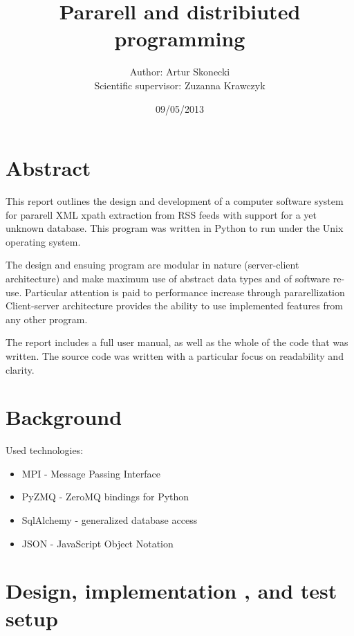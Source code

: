 \documentclass[a4paper,12pt]{article}
\title{Pararell and distribiuted programming}
\author{Author: Artur Skonecki \\ Scientific supervisor: Zuzanna Krawczyk}
\date{09/05/2013}
\begin{document}
\maketitle
\tableofcontents

\pagebreak
\section{Abstract}

This report outlines the design and development of a computer software
system for pararell XML xpath extraction from RSS feeds with support for a yet unknown database.
This program was written in Python to run under the Unix
operating system.


The design and ensuing program are modular
in nature (server-client architecture) and make maximum use of abstract data types and of software
re-use. Particular attention is paid to performance increase through pararellization
Client-server architecture provides the ability to use implemented features from any other program.


The report includes a full user manual, as well as the whole of the code that was written.
The source code was written with a particular focus on readability and clarity.

\section{Background}

Used technologies:
\begin{itemize}
 \item MPI - Message Passing Interface
 \item PyZMQ - ZeroMQ bindings for Python
 \item SqlAlchemy - generalized database access
 \item JSON - JavaScript Object Notation
\end{itemize}

\section{Design, implementation , and test setup}
\end{document}
